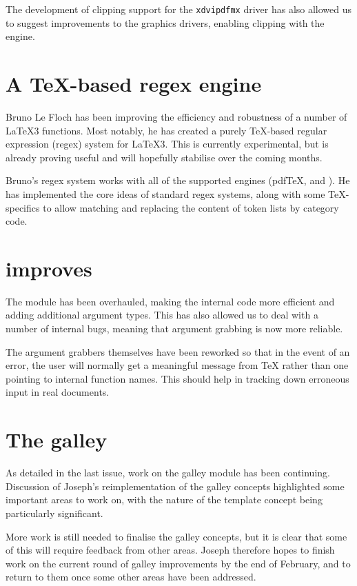\documentclass{ltnews}
\begin{document}
The development of clipping support for the \texttt{xdvipdfmx} driver has also allowed
us to suggest improvements to the \LaTeXe{} graphics drivers, enabling clipping
with the \XeTeX{} engine.

\section{A TeX-based regex engine}

Bruno Le Floch has been %
improving the efficiency
and robustness of a number of \LaTeX3 functions. Most notably, he has
created a purely \TeX{}-based regular expression (regex) system for \LaTeX3.
This is currently experimental, but is already proving useful and will
hopefully stabilise over the coming months.

Bruno's regex system works with all of the supported engines (pdf\TeX{},
\XeTeX{} and \LuaTeX{}). He has implemented the core ideas of standard
regex systems, along with some \TeX{}-specifics to allow matching and
replacing
the content of token lists %
by category code.

\section{ improves}

The  module has been overhauled, making the internal code
more efficient and adding additional argument types. This has also allowed
us to deal with a number of internal bugs, meaning that argument grabbing
is now more reliable.

The argument grabbers themselves have been reworked so that in the event of an error,
the user will normally get a meaningful message from \TeX{} rather than
one pointing to  internal function names. This should help
in tracking down erroneous input in real documents.

\section{The galley}

As detailed in the last issue, work on the galley module has been continuing.
Discussion of Joseph's reimplementation of the galley concepts highlighted
some important areas to work on, with the nature of the template concept
being particularly significant.

More work is still needed to finalise the galley concepts, but it is clear that
some of this will require feedback from other areas. Joseph therefore hopes
to finish work on the current round of galley improvements by the end of
February, and to return to them once some other areas have been addressed.
\end{document}
